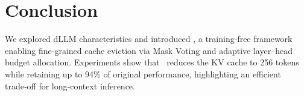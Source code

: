 \section{Conclusion}
We explored dLLM characteristics and introduced \mymethod, a training‑free framework enabling fine‑grained cache eviction via Mask Voting and adaptive layer–head budget allocation. Experiments show that \mymethod~reduces the KV cache to 256 tokens while retaining up to 94\% of original performance, highlighting an efficient trade‑off for long‑context inference.

